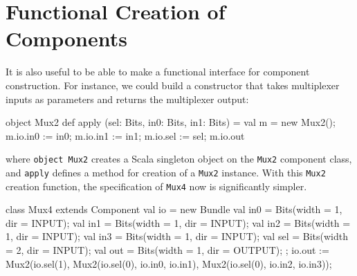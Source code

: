 \documentclass[10pt]{article}
\def\code#1{{\tt #1}}
\begin{document}
%
%
%
%
%

\section{Functional Creation of Components}
\label{sec:funconstructor}

It is also useful to be able to make a functional interface for
component construction.  For instance, we could build a constructor
that takes multiplexer inputs as parameters and returns the
multiplexer output:

\begin{scala}
object Mux2 {
  def apply (sel: Bits, in0: Bits, in1: Bits) = {
    val m = new Mux2();
    m.io.in0 := in0;
    m.io.in1 := in1;
    m.io.sel := sel;
    m.io.out
  }
}
\end{scala}

\noindent
where \code{object Mux2} creates a Scala singleton object on the \code{Mux2}
component class, and \code{apply} defines a method for creation of a \code{Mux2} instance.
%
With this \code{Mux2} creation function, the specification of \code{Mux4} now is
significantly simpler.

\begin{scala}
class Mux4 extends Component {
  val io = new Bundle {
    val in0 = Bits(width = 1, dir = INPUT);
    val in1 = Bits(width = 1, dir = INPUT);
    val in2 = Bits(width = 1, dir = INPUT);
    val in3 = Bits(width = 1, dir = INPUT);
    val sel = Bits(width = 2, dir = INPUT);
    val out = Bits(width = 1, dir = OUTPUT);
  };
  io.out := Mux2(io.sel(1),
                 Mux2(io.sel(0), io.in0, io.in1),
                 Mux2(io.sel(0), io.in2, io.in3));
}
\end{scala}
\end{document}
